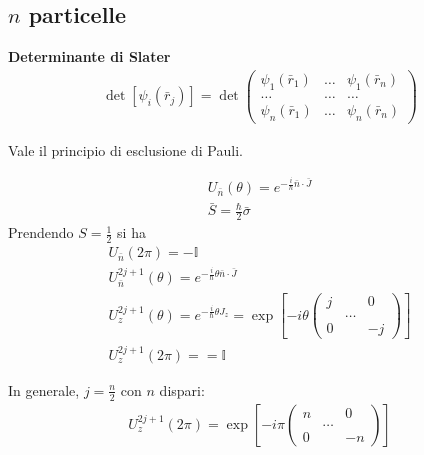\subsection{$n$ particelle} %

\textbf{Determinante di Slater}
\begin{equation}\begin{split}
\det{\left[\psi _i\left(\bar r_j\right)\right]}=\det{\left(\begin{matrix}\psi _1\left(\bar r_1\right) & \dots & \psi _1\left(\bar r_n\right) \\ \dots & \dots & \dots \\ \psi _n\left(\bar r_1\right) & \dots & \psi _n\left(\bar r_n\right) \end{matrix}\right)}
\end{split}\end{equation}

Vale il principio di esclusione di Pauli.

\begin{equation}\begin{split}
U_{\bar n}\left(\theta\right)=e^{-\frac{i}{\hbar }\bar n\cdot \bar J} \\
\bar S=\frac{\hbar }{2}\bar \sigma
\end{split}\end{equation}
Prendendo $S=\frac{1}{2}$ si ha
\begin{equation}\begin{split}
U_{\bar n}\left(2\pi\right)=-\mathbb{I} \\
U_{\bar n}^{2j+1}\left(\theta\right)=e^{-\frac{i}{\hbar }\theta \bar n\cdot \bar J} \\
U_z^{2j+1}\left(\theta\right)=e^{-\frac{i}{\hbar }\theta J_z}=\exp{\left[-i\theta\left(\begin{matrix}j & & 0 \\ & \dots & \\ 0 & & -j\end{matrix}\right)\right]} \\
U_z^{2j+1}\left(2\pi\right)= = \mathbb{I}
\end{split}\end{equation}

In generale, $j=\frac{n}{2}$ con $n$ dispari:
\begin{equation}\begin{split}
U_z^{2j+1}\left(2\pi\right)=\exp{\left[-i\pi\left(\begin{matrix}n & & 0 \\ & \dots & \\ 0 & & -n\end{matrix}\right)\right]}
\end{split}\end{equation}

